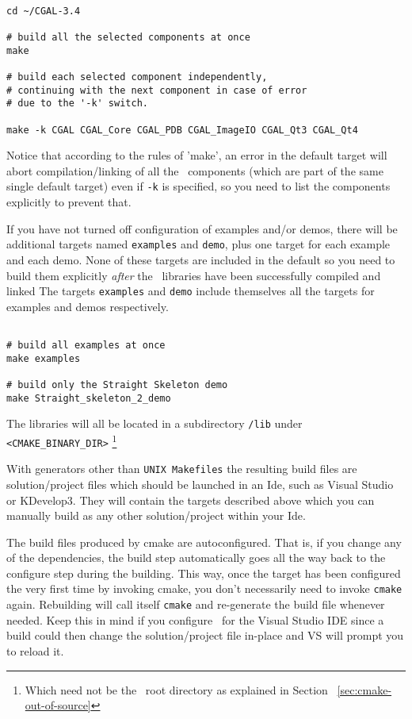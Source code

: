 {\ccTexHtml{\scriptsize}{}
\begin{verbatim}

cd ~/CGAL-3.4

# build all the selected components at once
make 

# build each selected component independently,
# continuing with the next component in case of error
# due to the '-k' switch.

make -k CGAL CGAL_Core CGAL_PDB CGAL_ImageIO CGAL_Qt3 CGAL_Qt4

\end{verbatim}
}

Notice that according to the rules of 'make', an error in the default target will abort compilation/linking of
all the \cgal\ components (which are part of the same single default target) even if {\tt -k} 
is specified, so you need to list the components explicitly to prevent that.

If you have not turned off configuration of examples and/or demos, there will be additional
targets named \texttt{examples} and \texttt{demo}, plus one target for each example and each demo.
None of these targets are included in the default so you need to build them explicitly
{\em after} the \cgal\ libraries have been successfully compiled and linked
The targets \texttt{examples} and \texttt{demo} include themselves all the targets
for examples and demos respectively.

{\ccTexHtml{\scriptsize}{}
\begin{verbatim}

# build all examples at once
make examples 

# build only the Straight Skeleton demo
make Straight_skeleton_2_demo

\end{verbatim}
}

The libraries will all be located in a subdirectory {\tt /lib} under {\tt <CMAKE\_BINARY\_DIR>}
\footnote{Which need not be the \cgal\ root directory as explained in Section ~\ref{sec:cmake-out-of-source}}

With generators other than {\tt UNIX Makefiles} the resulting build files are solution/project files which
should be launched in an {\sc Ide}, such as Visual Studio or KDevelop3. They will contain the targets described
above which you can manually build as any other solution/project within your {\sc Ide}.

\begin{ccAdvanced}
The build files produced by cmake are autoconfigured. That is, if you change any 
of the dependencies, the build step automatically goes all the way back to the configure step
during the building. This way, once the target has been configured the very first time by
invoking cmake, you don't necessarily need to invoke \texttt{cmake} again. Rebuilding will call
itself \texttt{cmake} and re-generate the build file whenever needed. Keep this in mind if you
configure \cgal\ for the Visual Studio IDE since a build could then change the solution/project 
file in-place and VS will prompt you to reload it.
\end{ccAdvanced}


